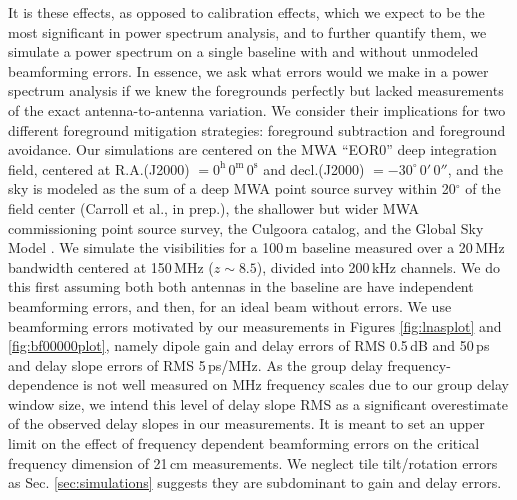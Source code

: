 It is these effects, as opposed to calibration effects, which we expect to be the most significant in power spectrum analysis, and to further quantify them, we simulate a power spectrum on a single baseline with and without unmodeled beamforming errors. In essence, we ask what errors would we make in a power spectrum analysis if we knew the foregrounds perfectly but lacked measurements of the exact antenna-to-antenna variation. We consider their implications for two different foreground mitigation strategies: foreground subtraction and foreground avoidance. Our simulations are centered on the MWA ``EOR0'' deep integration field, centered at R.A.(J2000) $= 0^\text{h}\,0^\text{m}\,0^\text{s}$ and decl.(J2000) $= -30^\circ\,0'\,0''$, and the sky is modeled as the sum of a deep MWA point source survey within 20$^\circ$ of the field center (Carroll et al., in prep.), the shallower but wider MWA commissioning point source survey\citep{MWACS}, the Culgoora catalog\citep{Slee1995}, and the Global Sky Model \citep{gsm}. We simulate the visibilities for a 100\,m baseline measured over a 20\,MHz bandwidth centered at 150\,MHz ($z\sim8.5$), divided into 200\,kHz channels. We do this first  assuming both both antennas in the baseline are have independent beamforming errors, and then, for an ideal beam without errors. We use beamforming errors motivated by our measurements in Figures \ref{fig:lnasplot} and \ref{fig:bf00000plot}, namely dipole gain and delay errors of RMS 0.5\,dB and 50\,ps and delay slope errors of RMS 5\,ps/MHz. As the group delay frequency-dependence is not well measured on MHz frequency scales due to our group delay window size, we intend this level of delay slope RMS as a significant overestimate of the observed delay slopes in our measurements. It is meant to set an upper limit on the effect of frequency dependent beamforming errors on the critical frequency dimension of 21\,cm measurements. We neglect tile tilt/rotation errors as Sec. \ref{sec:simulations} suggests they are subdominant to gain and delay errors. 

